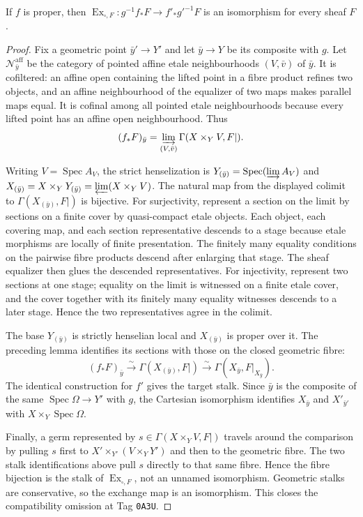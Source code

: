 \begin{lemma}
\label{lemma:weil-pbc-proper-underived-exchange}
If $f$ is proper, then
$\operatorname{Ex}_{\square,F}:g^{-1}f_*F\to f'_*g'^{-1}F$ is an
isomorphism for every sheaf $F$.
\end{lemma}
\begin{proof}

Fix a geometric point $\bar y'\to Y'$ and let $\bar y\to Y$ be its composite
with $g$.  Let $\mathcal N_{\bar y}^{\mathrm{aff}}$ be the category of
pointed affine etale neighbourhoods $(V,\bar v)$ of $\bar y$.  It is
cofiltered: an affine open containing the lifted point in a fibre product
refines two objects, and an affine neighbourhood of the equalizer of two
maps makes parallel maps equal.  It is cofinal among all pointed etale
neighbourhoods because every lifted point has an affine open neighbourhood.
Thus
\[
 (f_*F)_{\bar y}=
 \varinjlim_{(V,\bar v)}\Gamma(X\times_YV,F|).
\]

Writing $V=\operatorname{Spec}A_V$, the strict henselization is
$Y_{(\bar y)}=\operatorname{Spec}(\varinjlim A_V)$ and
$X_{(\bar y)}=X\times_YY_{(\bar y)}=\varprojlim(X\times_YV)$.  The natural
map from the displayed colimit to $\Gamma(X_{(\bar y)},F|)$ is bijective.
For surjectivity, represent a section on the limit by sections on a finite
cover by quasi-compact etale objects.  Each object, each covering map, and
each section representative descends to a stage because etale morphisms are
locally of finite presentation.  The finitely many equality conditions on
the pairwise fibre products descend after enlarging that stage.  The sheaf
equalizer then glues the descended representatives.  For injectivity,
represent two sections at one stage; equality on the limit is witnessed on
a finite etale cover, and the cover together with its finitely many equality
witnesses descends to a later stage.  Hence the two representatives agree in
the colimit.

The base $Y_{(\bar y)}$ is strictly henselian local and
$X_{(\bar y)}$ is proper over it.  The preceding lemma identifies its
sections with those on the closed geometric fibre:
\[
 (f_*F)_{\bar y}\xrightarrow{\sim}
 \Gamma(X_{(\bar y)},F|)\xrightarrow{\sim}
 \Gamma(X_{\bar y},F|_{X_{\bar y}}).
\]
The identical construction for $f'$ gives the target stalk.  Since $\bar y$
is the composite of the same $\operatorname{Spec}\Omega\to Y'$ with $g$,
the Cartesian isomorphism identifies $X_{\bar y}$ and $X'_{\bar y'}$ with
$X\times_Y\operatorname{Spec}\Omega$.

Finally, a germ represented by $s\in\Gamma(X\times_YV,F|)$ travels around
the comparison by pulling $s$ first to $X'\times_{Y'}(V\times_YY')$ and then
to the geometric fibre.  The two stalk identifications above pull $s$
directly to that same fibre.  Hence the fibre bijection is the stalk of
$\operatorname{Ex}_{\square,F}$, not an unnamed isomorphism.  Geometric
stalks are conservative, so the exchange map is an isomorphism.  This closes
the compatibility omission at Tag \texttt{0A3U}.
\end{proof}


